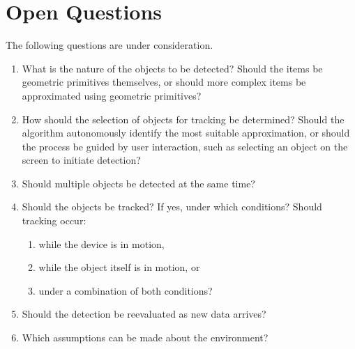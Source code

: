 


\chapter*{Open Questions}

The following questions are under consideration.
\begin{enumerate}
    \item What is the nature of the objects to be detected? Should the items be geometric primitives themselves, or should more complex items be approximated using geometric primitives?
    \item How should the selection of objects for tracking be determined? Should the algorithm autonomously identify the most suitable approximation, or should the process be guided by user interaction, such as selecting an object on the screen to initiate detection?
    \item Should multiple objects be detected at the same time?
    \item Should the objects be tracked? If yes, under which conditions? Should tracking occur:
    \begin{enumerate}
        \item while the device is in motion,
        \item while the object itself is in motion, or
        \item under a combination of both conditions?
    \end{enumerate}
    \item Should the detection be reevaluated as new data arrives?
    \item Which assumptions can be made about the environment?
\end{enumerate}

